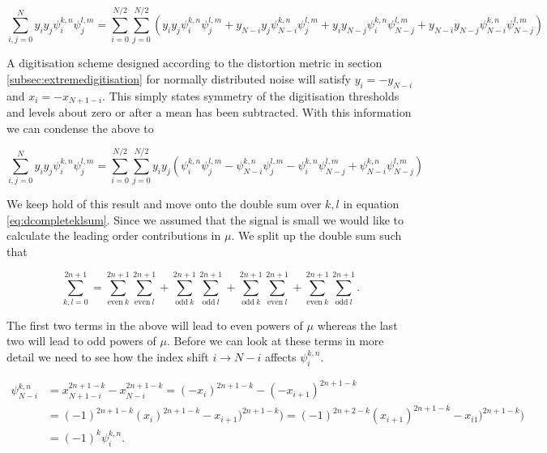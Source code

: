 \documentclass[apj]{emulateapj}
\begin{document}
\begin{equation}
\sum_{i,j = 0}^N y_i y_j \psi_i^{k, n} \psi_j^{l, m} = \sum_{i = 0}^{N/2}\sum_{j = 0}^{N/2} \left( y_i y_j \psi_i^{k, n} \psi_j^{l, m} +  y_{N-i} y_j \psi_{N-i}^{k, n} \psi_j^{l, m} + y_i y_{N-j} \psi_i^{k, n} \psi_{N-j}^{l, m} + y_{N-i} y_{N-j} \psi_{N-i}^{k, n} \psi_{N-j}^{l, m} \right)
\end{equation}

A digitisation scheme designed according to the distortion metric in section \ref{subsec:extremedigitisation} for normally distributed noise will satisfy $y_i = -y_{N-i}$ and $x_i = -x_{N+1-i}$.  This simply states symmetry of the digitisation thresholds and levels about zero or after a mean has been subtracted. With this information we can condense the above to

\begin{equation} \label{eq:ijsum}
\sum_{i,j = 0}^N y_i y_j \psi_i^{k, n} \psi_j^{l, m} = \sum_{i = 0}^{N/2}\sum_{j = 0}^{N/2} y_i y_j \left( \psi_i^{k, n} \psi_j^{l, m} - \psi_{N-i}^{k, n} \psi_j^{l, m} - \psi_i^{k, n} \psi_{N-j}^{l, m} + \psi_{N-i}^{k, n} \psi_{N-j}^{l, m} \right)
\end{equation}

We keep hold of this result and move onto the double sum over $k,l$ in equation \ref{eq:dcompleteklsum}. Since we assumed that the signal is small we would like to calculate the leading order contributions in $\mu$. We split up the double sum such that

\begin{equation} \label{eq:ksums}
\sum_{k, l = 0}^{2n+1} = \sum_{\mathrm{even} \> k}^{2n+1} \sum_{\mathrm{even} \> l}^{2n+1}  + \sum_{\mathrm{odd} \> k}^{2n+1} \sum_{\mathrm{odd} \> l}^{2n+1} + \sum_{\mathrm{odd} \> k}^{2n+1} \sum_{\mathrm{even} \> l}^{2n+1}  + \sum_{\mathrm{even} \> k}^{2n+1} \sum_{\mathrm{odd} \> l}^{2n+1}.
\end{equation}

The first two terms in the above will lead to even powers of $\mu$ whereas the last two will lead to odd powers of $\mu$. Before we can look at these terms in more detail we need to see how the index shift $i \to N-i$ affects $\psi_{i}^{k, n}$.

\begin{equation}
\begin{aligned}
\psi_{N-i}^{k,n} &= x_{N+1-i}^{2n+1-k} - x_{N-i}^{2n+1-k} = (-x_{i})^{2n+1-k} - (-x_{i+1})^{2n+1-k}\\
&= (-1)^{2n+1-k} (x_{i})^{2n+1-k} - x_{i+1})^{2n+1-k} ) = (-1)^{2n+2-k} (x_{i+1})^{2n+1-k} - x_{i1})^{2n+1-k} )\\
&= (-1)^{k} \psi_{i}^{k,n}.
\end{aligned}
\end{equation}
\end{document}
